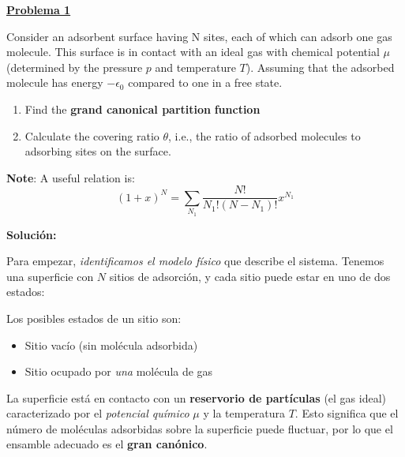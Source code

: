 \documentclass{article}
\newenvironment{AGbox}[1][7]%
{%
  \begin{tcolorbox}[
    enhanced, breakable,
    colframe=AppleGreen,
    colback=AppleGreen!#1,
    boxrule=1pt,
    borderline west={2mm}{-10mm}{AppleGreen},
    sharp corners=southwest,
    left=14pt,right=14pt,top=10pt,bottom=10pt,
     boxsep=6pt,
  ]%
}{%
  \end{tcolorbox}%
}
\begin{document}


\begin{AGbox}[8]
\textcolor{Apple Green}{\textbf{\underline{Problema 1}}} \vspace{2mm}

Consider an adsorbent surface having N sites, each of which can adsorb one gas
molecule. This surface is in contact with an ideal gas with chemical potential $\mu$
(determined by the pressure $p$ and temperature $T$). Assuming that the adsorbed
molecule has energy $-\epsilon_{0}$ compared to one in a free state.

\begin{enumerate}
    \item Find the \textbf{grand canonical partition} \textcolor{Cinnabar}{\textbf{function}}

    \item Calculate the covering ratio $\theta$, i.e., the ratio of adsorbed molecules to
    adsorbing sites on the surface.
\end{enumerate}

\textbf{Note}: A useful relation is: \[(1 + x)^{N} = \sum_{N_1} \frac{N!}{N_1! (N - N_1)!} x^{N_1}\]
\end{AGbox} \vspace{0.5cm}

\textcolor{Tuscany}{\textbf{Solución:}}

Para empezar, \emph{identificamos el modelo físico} que describe el sistema.  
Tenemos una superficie con \hbox{$N$} sitios de adsorción, y cada sitio puede estar en uno de dos estados:

Los posibles estados de un sitio son:

\begin{itemize}
    \item[$\bullet$] Sitio vacío (sin molécula adsorbida)
    \item[$\bullet$] Sitio ocupado por \emph{una} molécula de gas
\end{itemize}


La superficie está en contacto con un \textcolor{Lochinvar}{\textbf{reservorio de partículas}} (el gas ideal) caracterizado por el \emph{potencial químico} \(\mu\) y la temperatura \(T\). Esto significa que el número de moléculas adsorbidas sobre la superficie puede fluctuar, por lo que el ensamble adecuado es el \textcolor{Cinnabar}{\textbf{gran canónico}}.  
\end{document}
